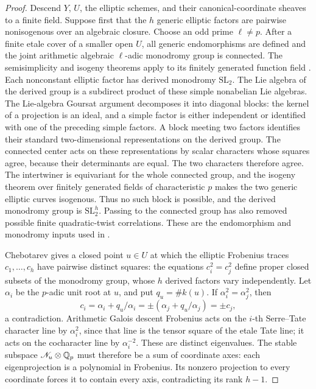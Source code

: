 \begin{proof}
Descend \(Y\), \(U\), the elliptic schemes, and their
canonical-coordinate sheaves to a finite field.  Suppose first that
the \(h\) generic elliptic factors are pairwise
nonisogenous over an algebraic closure.  Choose an odd prime
\(\ell\ne p\).  After a finite etale cover of a smaller open
\(U\), all generic endomorphisms are defined and the joint
arithmetic algebraic \(\ell\)-adic monodromy group is connected.
The semisimplicity and isogeny theorems apply to its finitely
generated function field \cite[Theorems~1.2 and~1.4]{Zarhin}.
Each nonconstant elliptic factor
has derived monodromy \(\mathrm{SL}_2\).  The Lie algebra of the
derived group is a subdirect product of these simple nonabelian
Lie algebras.  The Lie-algebra Goursat argument decomposes it into
diagonal blocks: the kernel of a projection is an ideal, and a
simple factor is either independent or identified with one of the
preceding simple factors.  A block meeting two factors identifies
their standard two-dimensional representations on the derived
group.  The connected center acts on these representations by
scalar characters whose squares agree, because their determinants
are equal.  The two characters therefore agree.  The intertwiner
is equivariant for the whole connected group, and the isogeny
theorem over finitely generated fields of characteristic \(p\)
makes the two generic elliptic curves isogenous.  Thus no such block
is possible, and the derived monodromy group is
\(\mathrm{SL}_2^h\).  Passing to the connected group has also
removed possible finite quadratic-twist correlations.  These are
the endomorphism and monodromy inputs used in
\cite[proof of Corollary~3.16]{HidaMu}.

Chebotarev gives a closed point \(u\in U\) at which the elliptic
Frobenius traces
\(c_1,\ldots,c_h\) have pairwise distinct squares: the equations
\(c_i^2=c_j^2\) define proper closed subsets of the monodromy
group, whose \(h\) derived factors vary independently.
Let \(\alpha_i\) be the \(p\)-adic unit root at \(u\), and put
\(q_u=\#k(u)\).  If \(\alpha_i^2=\alpha_j^2\), then
\[
 c_i=\alpha_i+q_u/\alpha_i
       =\pm(\alpha_j+q_u/\alpha_j)=\pm c_j,
\]
a contradiction.  Arithmetic Galois descent Frobenius acts on the
\(i\)-th Serre--Tate character line by \(\alpha_i^2\), since that
line is the tensor square of the etale Tate line; it acts on the
cocharacter line by \(\alpha_i^{-2}\).  These are distinct
eigenvalues.  The stable subspace \(\mathscr N_u\otimes\mathbb Q_p\)
must therefore be a sum of coordinate axes: each eigenprojection
is a polynomial in Frobenius.  Its nonzero projection to every
coordinate forces it to contain every axis, contradicting its
rank \(h-1\).


\end{proof}
